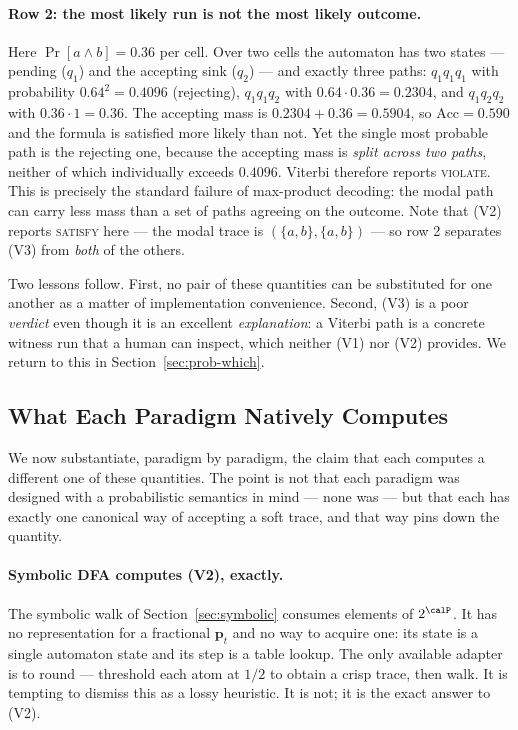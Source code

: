 \paragraph{Row 2: the most likely run is not the most likely outcome.} Here $\Pr[a \land b] = 0.36$ per cell. Over two cells the automaton has two states --- pending ($q_1$) and the accepting sink ($q_2$) --- and exactly three paths: $q_1 q_1 q_1$ with probability $0.64^2 = 0.4096$ (rejecting), $q_1 q_1 q_2$ with $0.64 \cdot 0.36 = 0.2304$, and $q_1 q_2 q_2$ with $0.36 \cdot 1 = 0.36$. The accepting mass is $0.2304 + 0.36 = 0.5904$, so $\mathrm{Acc} = 0.590$ and the formula is satisfied more likely than not. Yet the single most probable path is the rejecting one, because the accepting mass is \emph{split across two paths}, neither of which individually exceeds $0.4096$. Viterbi therefore reports \textsc{violate}. This is precisely the standard failure of max-product decoding: the modal path can carry less mass than a set of paths agreeing on the outcome. Note that (V2) reports \textsc{satisfy} here --- the modal trace is $(\{a,b\},\{a,b\})$ --- so row 2 separates (V3) from \emph{both} of the others.

Two lessons follow. First, no pair of these quantities can be substituted for one another as a matter of implementation convenience. Second, (V3) is a poor \emph{verdict} even though it is an excellent \emph{explanation}: a Viterbi path is a concrete witness run that a human can inspect, which neither (V1) nor (V2) provides. We return to this in Section~\ref{sec:prob-which}.

\subsection{What Each Paradigm Natively Computes}
\label{sec:prob-native}

We now substantiate, paradigm by paradigm, the claim that each computes a different one of these quantities. The point is not that each paradigm was designed with a probabilistic semantics in mind --- none was --- but that each has exactly one canonical way of accepting a soft trace, and that way pins down the quantity.

\paragraph{Symbolic DFA computes (V2), exactly.} The symbolic walk of Section~\ref{sec:symbolic} consumes elements of $2^\calP$. It has no representation for a fractional $\mathbf{p}_t$ and no way to acquire one: its state is a single automaton state and its step is a table lookup. The only available adapter is to round --- threshold each atom at $1/2$ to obtain a crisp trace, then walk. It is tempting to dismiss this as a lossy heuristic. It is not; it is the exact answer to (V2).

